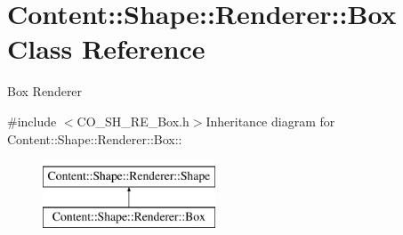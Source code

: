 \hypertarget{classContent_1_1Shape_1_1Renderer_1_1Box}{
\section{Content::Shape::Renderer::Box Class Reference}
\label{classContent_1_1Shape_1_1Renderer_1_1Box}
}


Box Renderer  


{\ttfamily \#include $<$CO\_\-SH\_\-RE\_\-Box.h$>$}Inheritance diagram for Content::Shape::Renderer::Box::\begin{figure}[H]
\begin{center}
\leavevmode
\includegraphics[height=2cm]{classContent_1_1Shape_1_1Renderer_1_1Box}
\end{center}
\end{figure}

